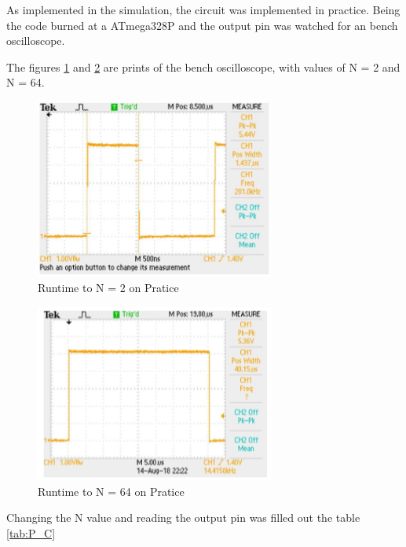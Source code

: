 \documentclass{article}
\begin{document}
As implemented in the simulation, the circuit was implemented in practice. Being the code burned at a ATmega328P and the output pin was watched  for an bench oscilloscope.

The figures \ref{fig:P_N_2} and \ref{fig:P_N_64} are prints of the bench oscilloscope, with values of N = 2 and N = 64.

\begin{figure}[!ht]
\centering
\includegraphics[width=0.7\textwidth]
{./figuras/P_N_2.PNG}
\caption{Runtime to N = 2 on Pratice}
\label{fig:P_N_2}
\end{figure}

\begin{figure}[!ht]
\centering
\includegraphics[width=0.7\textwidth]
{./figuras/P_N_64.PNG}
\caption{Runtime to N = 64 on Pratice}
\label{fig:P_N_64}
\end{figure}

Changing the N value and reading the output pin was filled out the table \ref{tab:P_C}
\end{document}
